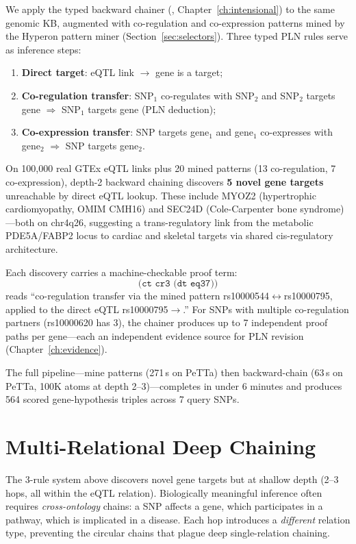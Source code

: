 \documentclass[11pt,openany]{report}
\begin{document}
We apply the typed backward chainer (,
Chapter~\ref{ch:intensional}) to the same genomic KB, augmented with
co-regulation and co-expression patterns mined by the Hyperon pattern
miner (Section~\ref{sec:selectors}).  Three typed PLN rules
serve as inference steps:
\begin{enumerate}
\item \textbf{Direct target}: eQTL link $\to$ gene is a target;
\item \textbf{Co-regulation transfer}: SNP$_1$ co-regulates with SNP$_2$
  and SNP$_2$ targets gene $\Rightarrow$ SNP$_1$ targets gene
  (PLN deduction);
\item \textbf{Co-expression transfer}: SNP targets gene$_1$ and
  gene$_1$ co-expresses with gene$_2$ $\Rightarrow$ SNP targets gene$_2$.
\end{enumerate}

On 100{,}000 real GTEx eQTL links plus 20 mined patterns (13
co-regulation, 7 co-expression), depth-2 backward chaining discovers
\textbf{5 novel gene targets} unreachable by direct eQTL lookup.
These include MYOZ2 (hypertrophic cardiomyopathy, OMIM CMH16) and
SEC24D (Cole-Carpenter bone syndrome)---both on chr4q26, suggesting a
trans-regulatory link from the metabolic PDE5A/FABP2 locus to cardiac
and skeletal targets via shared cis-regulatory architecture.

Each discovery carries a machine-checkable proof term:
\[
  \texttt{(ct~cr3~(dt~eq37))}
\]
reads ``co-regulation transfer via the mined pattern
rs10000544$\leftrightarrow$rs10000795, applied to the direct eQTL
rs10000795$\to$.''  For SNPs with multiple co-regulation
partners (rs10000620 has 3), the chainer produces up to 7 independent
proof paths per gene---each an independent evidence source for PLN
revision (Chapter~\ref{ch:evidence}).

The full pipeline---mine patterns (271\,s on PeTTa) then backward-chain
(63\,s on PeTTa, 100K atoms at depth 2--3)---completes in under 6
minutes and produces 564 scored gene-hypothesis triples across 7 query
SNPs.


\section{Multi-Relational Deep Chaining}
\label{sec:bio-deep}

The 3-rule system above discovers novel gene targets but at shallow
depth (2--3 hops, all within the eQTL relation).  Biologically
meaningful inference often requires \emph{cross-ontology} chains:
a SNP affects a gene, which participates in a pathway, which is
implicated in a disease.  Each hop introduces a \emph{different}
relation type, preventing the circular chains that plague deep
single-relation chaining.
\end{document}
